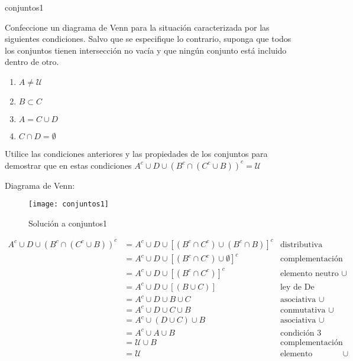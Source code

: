 
\begin{defproblem}{conjuntos1}%
 \begin{onlyproblem}%
	Confeccione un diagrama de Venn para la situación caracterizada por las siguientes condiciones. Salvo que se especifique lo contrario, suponga que todos los conjuntos tienen intersección no vacía y que ningún conjunto está incluido dentro de otro.
	
	\begin{enumerate}
		\item $ A \neq \mathcal{U} $
		\item $ B \subset C $
		\item $ A = C \cup D $
		\item $ C \cap D = \emptyset $
	\end{enumerate}

	Utilice las condiciones anteriores y las propiedades de los conjuntos para demostrar que en estas condiciones $ A^c \cup D \cup (B^c \cap (C^c \cup B))^c = \mathcal{U} $
 \end{onlyproblem}%
 \begin{onlysolution}%
 	Diagrama de Venn:
 	
 	\begin{figure}
 		\texttt{[image: conjuntos1]}
 		\caption[Solución a conjuntos1]{Solución a conjuntos1}
 		\label{fig:conjuntos1-solucion}
 	\end{figure}
 	
 	\begin{align*}
 	A^c \cup D \cup (B^c \cap (C^c \cup B))^c & = A^c \cup D \cup [(B^c \cap C^c) \cup (B^c \cap B)]^c &  \text{distributiva} \\	
 	& = A^c \cup D \cup [(B^c \cap C^c) \cup \emptyset]^c & \text{complementación} \\
 	& = A^c \cup D \cup [(B^c \cap C^c)]^c & \text{elemento neutro } \cup \\
 	& = A^c \cup D \cup [(B \cup C)] & \text{ley de De Morgan} \\
 	& = A^c \cup D \cup B \cup C & \text{asociativa } \cup \\
 	& = A^c \cup D \cup C \cup B & \text{conmutativa } \cup \\
 	& = A^c \cup (D \cup C) \cup B & \text{asociativa } \cup \\
 	& = A^c \cup A \cup B & \text{condición }3 \\
 	& = \mathcal{U} \cup B & \text{complementación} \\
 	& = \mathcal{U} & \text{elemento absorbente } \cup
 	\end{align*}
 \end{onlysolution}%
\end{defproblem}


